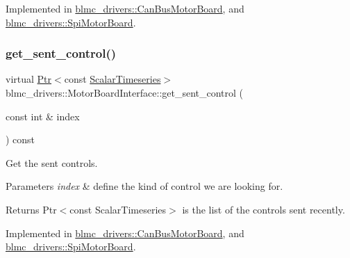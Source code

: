 Implemented in \hyperlink{classblmc__drivers_1_1CanBusMotorBoard_a5025602eac7b8c4ca1b2f5602e1a6640}{blmc\+\_\+drivers\+::\+Can\+Bus\+Motor\+Board}, and \hyperlink{classblmc__drivers_1_1SpiMotorBoard_a4efe6ae858714de5cf5e54346fb6493c}{blmc\+\_\+drivers\+::\+Spi\+Motor\+Board}.

\mbox{\label{classblmc__drivers_1_1MotorBoardInterface_a8dc6222e915fc96d89b13cbb0fcb0cda}} 
\subsubsection{\texorpdfstring{get\+\_\+sent\+\_\+control()}{get\_sent\_control()}}
{\footnotesize\ttfamily virtual \hyperlink{classblmc__drivers_1_1MotorBoardInterface_a6a733b7ed7a3a96f6b0712b6bb5307f8}{Ptr}$<$const \hyperlink{classblmc__drivers_1_1MotorBoardInterface_a14e237254ba495a66091ea3a3a33fa75}{Scalar\+Timeseries}$>$ blmc\+\_\+drivers\+::\+Motor\+Board\+Interface\+::get\+\_\+sent\+\_\+control (\begin{DoxyParamCaption}\item[{const int \&}]{index }\end{DoxyParamCaption}) const\hspace{0.3cm}{\ttfamily [pure virtual]}}



Get the sent controls. 


\begin{DoxyParams}{Parameters}
{\em index} & define the kind of control we are looking for. \\
\hline
\end{DoxyParams}
\begin{DoxyReturn}{Returns}
Ptr$<$const Scalar\+Timeseries$>$ is the list of the controls sent recently. 
\end{DoxyReturn}


Implemented in \hyperlink{classblmc__drivers_1_1CanBusMotorBoard_aa71ed313381440d9c2af00c5a13d6faa}{blmc\+\_\+drivers\+::\+Can\+Bus\+Motor\+Board}, and \hyperlink{classblmc__drivers_1_1SpiMotorBoard_af6e2b210a6746b82a01aa2f2b550d05d}{blmc\+\_\+drivers\+::\+Spi\+Motor\+Board}.

